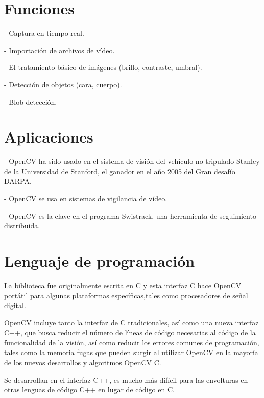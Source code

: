 \section{Funciones}

- Captura en tiempo real.

- Importación de archivos de vídeo.

- El tratamiento básico de imágenes (brillo, contraste, umbral).

- Detección de objetos (cara, cuerpo).

- Blob detección.

\section{Aplicaciones}

- OpenCV ha sido usado en el sistema de visión del vehículo no tripulado Stanley de la Universidad de Stanford, el ganador en el año 2005 del Gran desafío DARPA.

- OpenCV se usa en sistemas de vigilancia de vídeo.

- OpenCV es la clave en el programa Swistrack, una herramienta de seguimiento distribuida.

\section{Lenguaje de programación}

La biblioteca fue originalmente escrita en C y esta interfaz C hace OpenCV portátil para algunas plataformas específicas,tales como procesadores de señal digital.

OpenCV incluye tanto la interfaz de C tradicionales, así como una nueva interfaz C++, que busca reducir el número de líneas de código necesarias al código de la funcionalidad de la visión, así como reducir los errores comunes de programación, tales como la memoria fugas que pueden surgir al utilizar OpenCV en la mayoría de los nuevos desarrollos y algoritmos OpenCV C.

Se desarrollan en el interfaz C++, es mucho más difícil para las envolturas en otras lenguas de código C++ en lugar de código en C. \cite{SourceForceWebSite} \cite{UbaaWebSite} \cite{YahooWebSite}